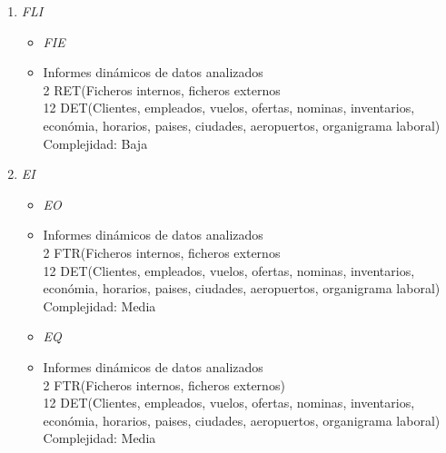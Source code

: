 \begin{enumerate}
	\item \textit{FLI}
	\begin{itemize}
	\item \textit{FIE}
		\item Informes dinámicos de datos analizados \\
			2 RET(Ficheros internos, ficheros externos \\
			12 DET(Clientes, empleados, vuelos, ofertas, nominas, inventarios, económia, horarios, paises, ciudades, aeropuertos, organigrama laboral) \\
			Complejidad: Baja\\

	\end{itemize}
	
	\item \textit{EI}
	
	\begin{itemize}
	\item \textit{EO}
		\item Informes dinámicos de datos analizados \\
			2 FTR(Ficheros internos, ficheros externos \\
			12 DET(Clientes, empleados, vuelos, ofertas, nominas, inventarios, económia, horarios, paises, ciudades, aeropuertos, organigrama laboral) \\
			Complejidad: Media\\
	\end{itemize}
	\begin{itemize}
	\item \textit{EQ}
		\item Informes dinámicos de datos analizados \\
			2 FTR(Ficheros internos, ficheros externos) \\
			12 DET(Clientes, empleados, vuelos, ofertas, nominas, inventarios, económia, horarios, paises, ciudades, aeropuertos, organigrama laboral) \\
			Complejidad: Media\\
		
	\end{itemize}		
\end{enumerate}
